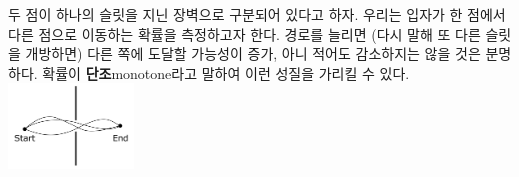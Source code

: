 \documentclass[a4paper,chapter,kosection,atbegshi,hidelinks,itemph]{oblivoir}
\begin{document}
\pagestyle{hf}
두 점이 하나의 슬릿을 지닌 장벽으로 구분되어 있다고 하자.
우리는 입자가 한 점에서 다른 점으로 이동하는 확률을 측정하고자 한다.
경로를 늘리면 (다시 말해 또 다른 슬릿을 개방하면) 다른 쪽에 도달할 가능성이 증가,
아니 적어도 감소하지는 않을 것은 분명하다.
확률이 \textbf{단조}{\footnotesize monotone}라고 말하여 이런 성질을 가리킬 수 있다.
    \includegraphics[width=0.25\textwidth]{iqis1_001}
\end{document}

